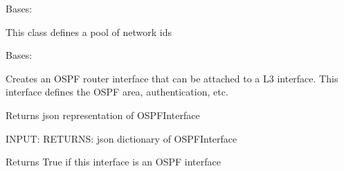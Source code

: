 \documentclass[letterpaper,10pt,english]{sphinxmanual}
\begin{document}

\begin{fulllineitems}
\label{acitoolkit:acitoolkit.NetworkPool}
Bases: {\hyperref[acibaseobject:acibaseobject.BaseACIObject]{}}

This class defines a pool of network ids

\begin{fulllineitems}
\label{acitoolkit:acitoolkit.NetworkPool.get_json}
\end{fulllineitems}


\end{fulllineitems}


\begin{fulllineitems}
\label{acitoolkit:acitoolkit.OSPFInterface}
Bases: {\hyperref[acibaseobject:acibaseobject.BaseACIObject]{}}

Creates an OSPF router interface that can be attached to a L3 interface.
This interface defines the OSPF area, authentication, etc.

\begin{fulllineitems}
\label{acitoolkit:acitoolkit.OSPFInterface.get_json}
Returns json representation of OSPFInterface

INPUT:
RETURNS: json dictionary of OSPFInterface

\end{fulllineitems}


\begin{fulllineitems}
\label{acitoolkit:acitoolkit.OSPFInterface.is_interface}
\end{fulllineitems}


\begin{fulllineitems}
\label{acitoolkit:acitoolkit.OSPFInterface.is_ospf}
Returns True if this interface is an OSPF interface

\end{fulllineitems}


\end{fulllineitems}
\end{document}
